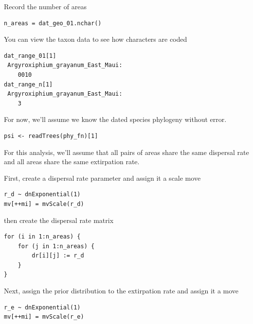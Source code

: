 Record the number of areas

\begin{snugshade}
\begin{lstlisting}
n_areas = dat_geo_01.nchar()
\end{lstlisting}
\end{snugshade}

You can view the taxon data to see how characters are coded
\begin{snugshade}
\begin{lstlisting}
dat_range_01[1]
 Argyroxiphium_grayanum_East_Maui:
    0010
dat_range_n[1]
 Argyroxiphium_grayanum_East_Maui:
    3
\end{lstlisting}
\end{snugshade}

For now, we'll assume we know the dated species phylogeny without error.

\begin{snugshade}
\begin{lstlisting}
psi <- readTrees(phy_fn)[1]
\end{lstlisting}
\end{snugshade}


For this analysis, we'll assume that all pairs of areas share the same dispersal rate and all areas share the same extirpation rate.

First, create a dispersal rate parameter and assign it a scale move

\begin{snugshade}
\begin{lstlisting}
r_d ~ dnExponential(1)
mv[++mi] = mvScale(r_d)
\end{lstlisting}
\end{snugshade}

then create the dispersal rate matrix

\begin{snugshade}
\begin{lstlisting}
for (i in 1:n_areas) {
    for (j in 1:n_areas) {
        dr[i][j] := r_d
    }
}
\end{lstlisting}
\end{snugshade}

Next, assign the prior distribution to the extirpation rate and assign it a move

\begin{snugshade}
\begin{lstlisting}
r_e ~ dnExponential(1)
mv[++mi] = mvScale(r_e)
\end{lstlisting}
\end{snugshade}

